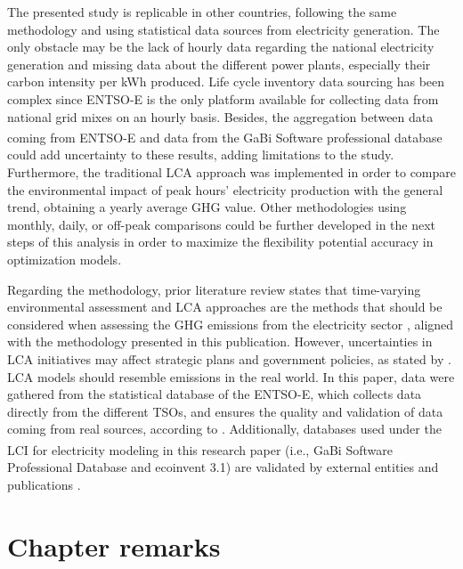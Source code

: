 {{{{The presented study is replicable in other countries, following the same methodology and using statistical data sources from electricity generation. The only obstacle may be the lack of hourly data regarding the national electricity generation and  missing data about the different power plants, especially their carbon intensity per kWh produced. Life cycle inventory data sourcing has been complex since ENTSO-E is the only platform available for collecting data from national grid mixes on an hourly basis. Besides, the aggregation between data coming from ENTSO-E and data from the GaBi\textsuperscript{\textregistered} Software professional database could add  uncertainty to these results, adding limitations to the study. Furthermore, the traditional LCA approach was implemented in order to compare the environmental impact of peak hours' electricity production with the general trend,  obtaining a yearly average GHG value. Other methodologies using monthly, daily, or off-peak comparisons could be further developed in the next steps of this analysis in order to maximize the flexibility potential accuracy in optimization models.

\unskip
Regarding the methodology, prior literature review states that time-varying environmental assessment and LCA approaches are the methods that should  be considered when assessing the GHG emissions from the electricity sector \cite{Khan2019GHGreview, Khan2019CarbonIntensity, Baumann2019, MESSAGIE2014469}, aligned with the methodology presented in this publication. However, uncertainties in LCA initiatives may affect strategic plans and government policies, as stated by \cite{madushela2016data}. LCA models should resemble emissions in the real world. In this paper, data were gathered from the statistical database of the ENTSO-E, which collects data directly from the different TSOs, and ensures the quality and validation of data coming from real sources, according to \cite{Hirth2018ThePlatform}. Additionally, databases used under the LCI for electricity modeling in this research paper (i.e., GaBi\textsuperscript{\textregistered} Software Professional Database and ecoinvent 3.1) are validated by external entities and publications \cite{Buyle2019, 2006ISOGuidelines}.

\newpage
\section{Chapter remarks} \label{Conclusions}

}}}}

